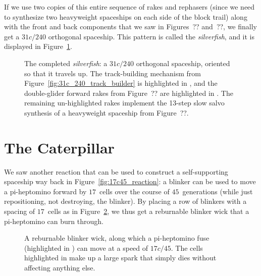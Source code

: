 

If we use two copies of this entire sequence of rakes and rephasers (since we need to synthesize two heavyweight spaceships on each side of the block trail) along with the front and back components that we saw in Figures~?? and~??, we finally get a $31c/240$ orthogonal spaceship. This pattern is called the \emph{silverfish}, and it is displayed in Figure~\ref{fig:silverfish}.

\begin{figure}[!htbp]
	\centering
	\caption{The completed \emph{silverfish}: a $31c/240$ orthogonal spaceship, oriented so that it travels up. The track-building mechanism from Figure~\ref{fig:31c_240_track_builder} is highlighted in , and the double-glider forward rakes from Figure~?? are highlighted in . The remaining un-highlighted rakes implement the 13-step slow salvo synthesis of a heavyweight spaceship from Figure~??.}\label{fig:silverfish}
\end{figure}


\section{The Caterpillar}\label{sec:caterpillar}

We saw another reaction that can be used to construct a self-supporting spaceship way back in Figure~\ref{fig:17c45_reaction}: a blinker can be used to move a pi-heptomino forward by $17$~cells over the course of $45$~generations (while just repositioning, not destroying, the blinker). By placing a row of blinkers with a spacing of $17$~cells as in Figure~\ref{fig:reburnable_blinker_wick}, we thus get a reburnable blinker wick that a pi-heptomino can burn through.

\begin{figure}[!htb]
	\centering
	\caption{A reburnable blinker wick, along which a pi-heptomino fuse (highlighted in ) can move at a speed of $17c/45$. The cells highlighted in  make up a large spark that simply dies without affecting anything else.}\label{fig:reburnable_blinker_wick}
\end{figure}

